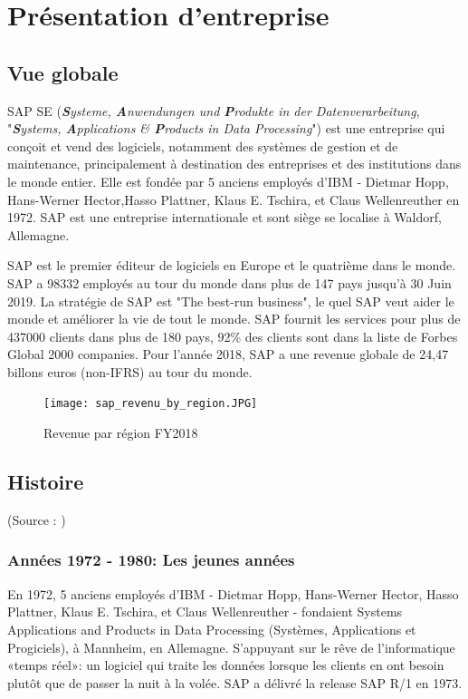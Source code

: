 
\section{Présentation d'entreprise}

\subsection{Vue globale}
    \par SAP SE (\textit{\textbf{S}ysteme, \textbf{A}nwendungen und \textbf{P}rodukte in der Datenverarbeitung}, "\textit{\textbf{S}ystems, \textbf{A}pplications \& \textbf{P}roducts in Data Processing}") est une entreprise qui conçoit et vend des logiciels, notamment des systèmes de gestion et de maintenance, principalement à destination des entreprises et des institutions dans le monde entier. Elle est fondée par 5 anciens employés d’IBM - Dietmar Hopp, Hans-Werner Hector,Hasso Plattner, Klaus E. Tschira, et Claus Wellenreuther en 1972. SAP est une entreprise internationale et sont siège se localise à Waldorf, Allemagne.
    
    \par \cite{SAP_Corporate_Fact_Sheet} SAP est le premier éditeur de logiciels en Europe et le quatrième dans le monde. SAP a 98332 employés au tour du monde dans plus de 147 pays jusqu'à 30 Juin 2019. La stratégie de SAP est "The best-run business", le quel SAP veut aider le monde et améliorer la vie de tout le monde. SAP fournit les services pour plus de 437000 clients dans plus de 180 pays, 92\% des clients sont dans la liste de Forbes Global 2000 companies. Pour l'année 2018, SAP a une revenue globale de 24,47 billons euros (non-IFRS) au tour du monde.
    \begin{figure}[H]
        \flushleft
        \texttt{[image: sap\_revenu\_by\_region.JPG]}
        \caption{Revenue par région FY2018}
        \label{fig:revenue_by_region2018_label}
    \end{figure}
    
\newpage    
\subsection{Histoire}
    (Source : \citet{SAP-History})
    \subsubsection{Années 1972 - 1980: Les jeunes années}
    En 1972, 5 anciens employés d'IBM - Dietmar Hopp, Hans-Werner Hector, Hasso Plattner, Klaus E. Tschira, et Claus Wellenreuther - fondaient Systems Applications and Products in Data Processing (Systèmes, Applications et Progiciels), à Mannheim, en Allemagne. S'appuyant sur le rêve de l'informatique «temps réel»: un logiciel qui traite les données lorsque les clients en ont besoin plutôt que de passer la nuit à la volée. SAP a délivré la release SAP R/1 en 1973.

